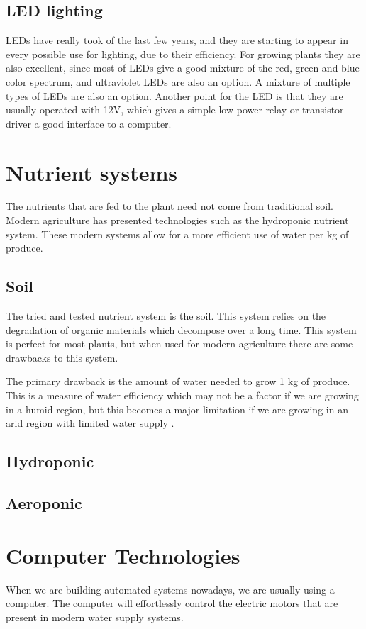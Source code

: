 \documentclass[a4paper,12pt,twoside,openright,titlepage]{book}
\begin{document}
\subsection{LED lighting}
LEDs have really took of the last few years, and they are starting to appear in every possible use for lighting, due to their efficiency.
For growing plants they are also excellent, since most of LEDs give a good mixture of the red, green and blue color spectrum, and ultraviolet LEDs are also an option.
A mixture of multiple types of LEDs are also an option.
Another point for the LED is that they are usually operated with 12V, which gives a simple low-power relay or transistor driver a good interface to a computer.

\section{Nutrient systems}
The nutrients that are fed to the plant need not come from traditional soil.
Modern agriculture has presented technologies such as the hydroponic nutrient system.
These modern systems allow for a more efficient use of water per kg of produce.

\subsection{Soil}
The tried and tested nutrient system is the soil. This system relies on the degradation of organic materials which decompose over a long time. This system is perfect for most plants, but when used for modern agriculture there are some drawbacks to this system.

The primary drawback is the amount of water needed to grow 1 kg of produce. This is a measure of water efficiency which may not be a factor if we are growing in a humid region, but this becomes a major limitation if we are growing in an arid region with limited water supply \cite{TODO}.

\subsection{Hydroponic}


\subsection{Aeroponic}


\section{Computer Technologies}
When we are building automated systems nowadays, we are usually using a computer.
The computer will effortlessly control the electric motors that are present in modern water supply systems.
\end{document}
